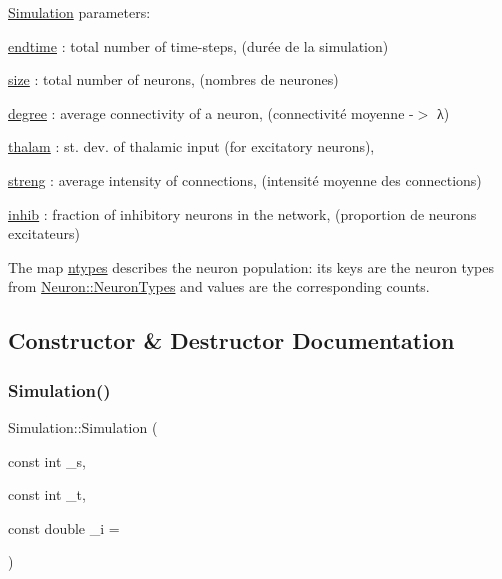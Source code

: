 \hyperlink{classSimulation}{Simulation} parameters\+:
\begin{DoxyItemize}
\item \hyperlink{classSimulation_ae57735a4ad942d9d217fb2235a644d1b}{endtime} \+: total number of time-\/steps, (durée de la simulation)
\item \hyperlink{classSimulation_ae198f9ac020ed6bc6ebbd608ab3f959d}{size} \+: total number of neurons, (nombres de neurones)
\item \hyperlink{classSimulation_ad0197878662d63d3ad1699aa7ffe01b2}{degree} \+: average connectivity of a neuron, (connectivité moyenne -\/$>$ λ)
\item \hyperlink{classSimulation_a7fca2f5f79a662f91736b0e5f30598c1}{thalam} \+: st. dev. of thalamic input (for excitatory neurons),
\item \hyperlink{classSimulation_adfda098679d8fcb864ecd87409087d02}{streng} \+: average intensity of connections, (intensité moyenne des connections)
\item \hyperlink{classSimulation_a14c04fb020df35f875b1f5b2aab7a562}{inhib} \+: fraction of inhibitory neurons in the network, (proportion de neurons excitateurs)
\end{DoxyItemize}

The map \hyperlink{classSimulation_a445d67187d6cc08c4c098ca498ee87d7}{ntypes} describes the neuron population\+: its keys are the neuron types from \hyperlink{classNeuron_ab4b47274e756b72923d2f8a9a5037d23}{Neuron\+::\+Neuron\+Types} and values are the corresponding counts. 

\subsection{Constructor \& Destructor Documentation}
\mbox{\label{classSimulation_a26f2ed7943035d802b1b2182ba04af12}} 
\subsubsection{\texorpdfstring{Simulation()}{Simulation()}\hspace{0.1cm}{\footnotesize\ttfamily [1/2]}}
{\footnotesize\ttfamily Simulation\+::\+Simulation (\begin{DoxyParamCaption}\item[{const int}]{\+\_\+s,  }\item[{const int}]{\+\_\+t,  }\item[{const double}]{\+\_\+i = {} }\end{DoxyParamCaption})\hspace{0.3cm}{\ttfamily [inline]}}


